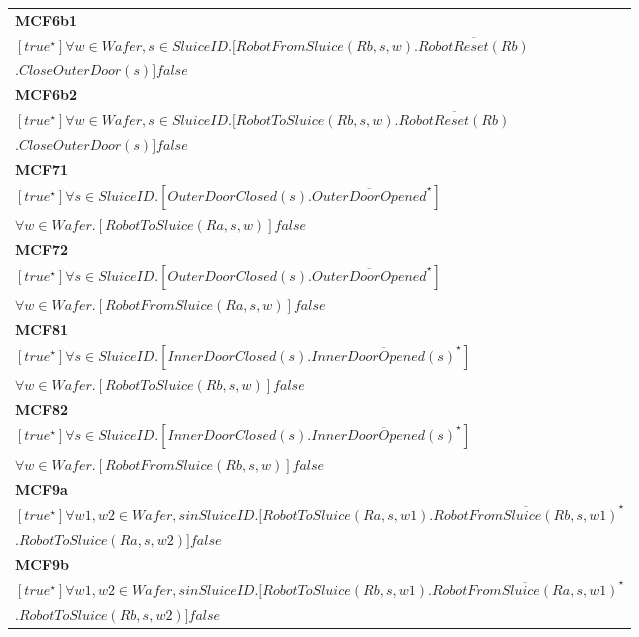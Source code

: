 \documentclass[12pt]{report}
\begin{document}
\begin{longtable}{p{\textwidth}}
        \textbf{MCF6b1}\\
        $[true^{\star}] \forall w \in Wafer, s \in SluiceID.[RobotFromSluice(Rb,s,w).\overline{RobotReset(Rb)}$ \\
        $.CloseOuterDoor(s)]false$\\
        \hline

        \textbf{MCF6b2}\\
        $[true^{\star}] \forall w \in Wafer, s \in SluiceID.[RobotToSluice(Rb,s,w).\overline{RobotReset(Rb)}$ \\
        $.CloseOuterDoor(s)]false$\\
        \hline

        \textbf{MCF71}\\
        $[true^{\star}] \forall s \in SluiceID.[OuterDoorClosed(s).\overline{OuterDoorOpened}^{\star}]$ \\
        $\forall w \in Wafer. [RobotToSluice(Ra,s,w)]false$\\
        \hline

        \textbf{MCF72}\\
        $[true^{\star}] \forall s \in SluiceID.[OuterDoorClosed(s).\overline{OuterDoorOpened}^{\star}]$ \\
        $\forall w \in Wafer. [RobotFromSluice(Ra,s,w)]false$\\
        \hline

        \textbf{MCF81}\\
        $[true^{\star}] \forall s \in SluiceID.[InnerDoorClosed(s).\overline{InnerDoorOpened(s)}^{\star}]$ \\
        $\forall w \in Wafer. [RobotToSluice(Rb, s, w)]false$\\
        \hline

        \textbf{MCF82}\\
        $[true^{\star}] \forall s \in SluiceID.[InnerDoorClosed(s).\overline{InnerDoorOpened(s)}^{\star}]$ \\
        $\forall w \in Wafer. [RobotFromSluice(Rb, s, w)]false$\\
        \hline

        \textbf{MCF9a}\\
        $[true^{\star}] \forall w1,w2 \in Wafer, s in SluiceID.[RobotToSluice(Ra,s,w1).\overline{RobotFromSluice(Rb,s,w1)}^{\star}$ \\
        $.RobotToSluice(Ra,s,w2)]false$\\
        \hline

        \textbf{MCF9b}\\
        $[true^{\star}] \forall w1,w2 \in Wafer, s in SluiceID.[RobotToSluice(Rb,s,w1).\overline{RobotFromSluice(Ra,s,w1)}^{\star}$ \\
        $.RobotToSluice(Rb,s,w2)]false$ \\
        \hline


\end{longtable}
\end{document}
